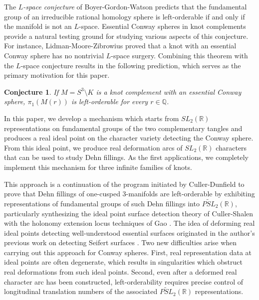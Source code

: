 \documentclass{article}
\theoremstyle{plain}
\theoremstyle{definition}
\theoremstyle{plain}
\theoremstyle{plain}
\theoremstyle{plain}
\theoremstyle{remark}
\theoremstyle{remark}
\theoremstyle{plain}
\newtheorem{conjecture}[theorem]{Conjecture}
\theoremstyle{plain}
\newcounter{main}
\theoremstyle{plain}
\theoremstyle{plain}
\begin{document}
\medskip

The \emph{$L$-space conjecture} of Boyer-Gordon-Watson \cite{bgw} predicts that the fundamental group of an irreducible rational homology sphere is left-orderable if and only if the manifold is not an $L$-space. Essential Conway spheres in knot complements provide a natural testing ground for studying various aspects of this conjecture. For instance, Lidman-Moore-Zibrowius \cite{lmz} proved that a knot with an essential Conway sphere has no nontrivial $L$-space surgery. Combining this theorem with the $L$-space conjecture results in the following prediction, which serves as the primary motivation for this paper.

\begin{conjecture}\label{conj:main}
If $M = S^3 \setminus K$ is a knot complement with an essential Conway sphere, $\pi_1(M(r))$ is left-orderable for every $r \in \mathbb{Q}$. 
\end{conjecture}

In this paper, we develop a mechanism which starts from $SL_2(\mathbb R)$ representations on fundamental groups of the two complementary tangles and produces a real ideal point on the character variety detecting the Conway sphere. From this ideal point, we produce real deformation arcs of $SL_2(\mathbb R)$ characters that can be used to study Dehn fillings. As the first applications, we completely implement this mechanism for three infinite families of knots.

\medskip

This approach is a continuation of the program initiated by Culler-Dunfield \cite{cullerdunfield} to prove that Dehn fillings of one-cusped 3-manifolds are left-orderable by exhibiting representations of fundamental groups of such Dehn fillings into $\widetilde{PSL}_2(\mathbb{R})$, particularly synthesizing the ideal point surface detection theory of Culler-Shalen \cite{cullershalen} with the holonomy extension locus techniques of Gao \cite{gao}. The idea of deforming real ideal points detecting well-understood essential surfaces originated in the author's previous work on detecting Seifert surfaces \cite{WangDetectedSeifertSurfaces}. Two new difficulties arise when carrying out this approach for Conway spheres. First, real representation data at ideal points are often degenerate, which results in singularities which obstruct real deformations from such ideal points. Second, even after a deformed real character arc has been constructed, left-orderability requires precise control of longitudinal translation numbers of the associated $\widetilde{PSL}_2(\mathbb R)$ representations. 
\end{document}
